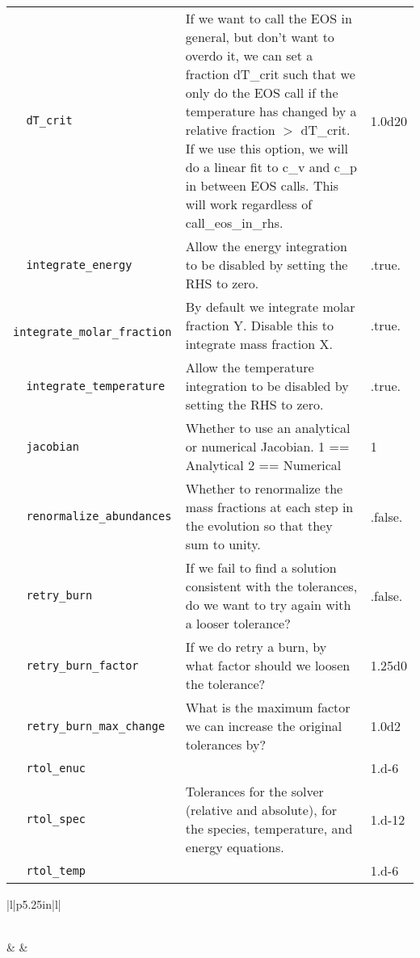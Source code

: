 \begin{landscape}
{\begin{center}
\begin{longtable}{|l|p{5.25in}|l|}
\rowcolor{tableShade}
\verb=  dT_crit  = &   If we want to call the EOS in general, but don't want to overdo it, we can set a fraction dT\_crit such that we only do the EOS call if the temperature has changed by a relative fraction $>$ dT\_crit. If we use this option, we will do a linear fit to c\_v and c\_p in between EOS calls. This will work regardless of call\_eos\_in\_rhs.  &  1.0d20 \\
\verb=  integrate_energy  = &   Allow the energy integration to be disabled by setting the RHS to zero.  &  .true. \\
\rowcolor{tableShade}
\verb=  integrate_molar_fraction  = &   By default we integrate molar fraction Y. Disable this to integrate mass fraction X.  &  .true. \\
\verb=  integrate_temperature  = &   Allow the temperature integration to be disabled by setting the RHS to zero.  &  .true. \\
\rowcolor{tableShade}
\verb=  jacobian  = &   Whether to use an analytical or numerical Jacobian. 1 == Analytical 2 == Numerical  &  1 \\
\verb=  renormalize_abundances  = &   Whether to renormalize the mass fractions at each step in the evolution so that they sum to unity.  &  .false. \\
\rowcolor{tableShade}
\verb=  retry_burn  = &   If we fail to find a solution consistent with the tolerances, do we want to try again with a looser tolerance?  &  .false. \\
\verb=  retry_burn_factor  = &   If we do retry a burn, by what factor should we loosen the tolerance?  &  1.25d0 \\
\rowcolor{tableShade}
\verb=  retry_burn_max_change  = &   What is the maximum factor we can increase the original tolerances by?  &  1.0d2 \\
\verb=  rtol_enuc  = &    &  1.d-6 \\
\rowcolor{tableShade}
\verb=  rtol_spec  = &   Tolerances for the solver (relative and absolute), for the species, temperature, and energy equations.  &  1.d-12 \\
\verb=  rtol_temp  = &    &  1.d-6 \\


\end{longtable}
\end{center}

} %


{\small

\renewcommand{\arraystretch}{1.5}
%
\begin{center}
\begin{longtable}{|l|p{5.25in}|l|}
\caption[multigamma parameters.]{multigamma parameters.} \label{table: multigamma runtime} \\
%
\hline {} & 
        & 
        \\ \hline 
\endfirsthead


\end{longtable}
\end{center}}
\end{landscape}
